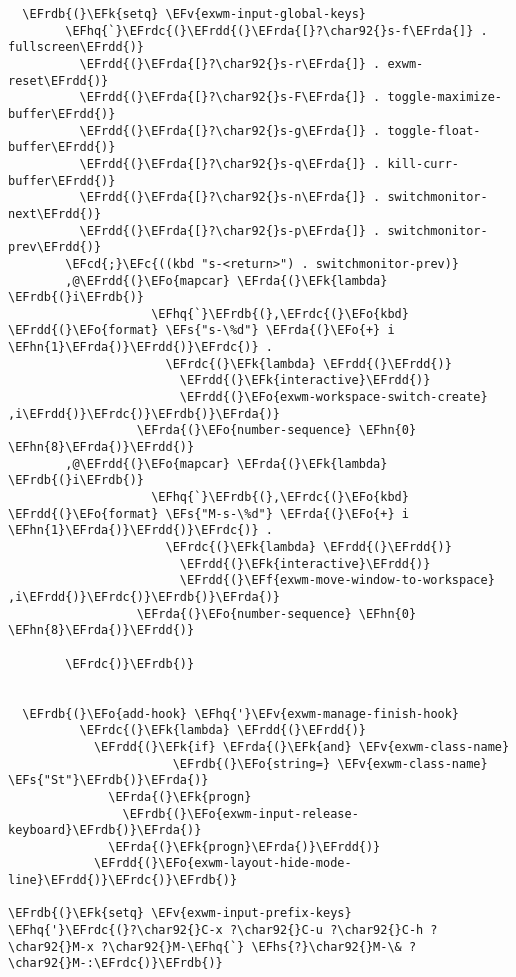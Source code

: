 \documentclass[a4wide,10pt]{article}
\newcommand{\EFc}[1]{\textcolor{EFc}{#1}} %
\newcommand{\EFcd}[1]{\textcolor{EFcd}{#1}} %
\newcommand{\EFs}[1]{\textcolor{EFs}{#1}} %
\newcommand{\EFk}[1]{\textcolor{EFk}{#1}} %
\newcommand{\EFf}[1]{\textcolor{EFf}{#1}} %
\newcommand{\EFv}[1]{\textcolor{EFv}{#1}} %
\newcommand{\EFo}[1]{\textcolor{EFo}{#1}} %
\newcommand{\EFhn}[1]{\textcolor{EFhn}{\textbf{#1}}} %
\newcommand{\EFhq}[1]{\textcolor{EFhq}{#1}} %
\newcommand{\EFhs}[1]{\textcolor{EFhs}{#1}} %
\newcommand{\EFrda}[1]{\textcolor{EFrda}{#1}} %
\newcommand{\EFrdb}[1]{\textcolor{EFrdb}{#1}} %
\newcommand{\EFrdc}[1]{\textcolor{EFrdc}{#1}} %
\newcommand{\EFrdd}[1]{\textcolor{EFrdd}{#1}} %
\begin{document}
\begin{Code}
\begin{Verbatim}
  \EFrdb{(}\EFk{setq} \EFv{exwm-input-global-keys}
        \EFhq{`}\EFrdc{(}\EFrdd{(}\EFrda{[}?\char92{}s-f\EFrda{]} . fullscreen\EFrdd{)}
          \EFrdd{(}\EFrda{[}?\char92{}s-r\EFrda{]} . exwm-reset\EFrdd{)}
          \EFrdd{(}\EFrda{[}?\char92{}s-F\EFrda{]} . toggle-maximize-buffer\EFrdd{)}
          \EFrdd{(}\EFrda{[}?\char92{}s-g\EFrda{]} . toggle-float-buffer\EFrdd{)}
          \EFrdd{(}\EFrda{[}?\char92{}s-q\EFrda{]} . kill-curr-buffer\EFrdd{)}
          \EFrdd{(}\EFrda{[}?\char92{}s-n\EFrda{]} . switchmonitor-next\EFrdd{)}
          \EFrdd{(}\EFrda{[}?\char92{}s-p\EFrda{]} . switchmonitor-prev\EFrdd{)}
        \EFcd{;}\EFc{((kbd "s-<return>") . switchmonitor-prev)}
        ,@\EFrdd{(}\EFo{mapcar} \EFrda{(}\EFk{lambda} \EFrdb{(}i\EFrdb{)}
                    \EFhq{`}\EFrdb{(},\EFrdc{(}\EFo{kbd} \EFrdd{(}\EFo{format} \EFs{"s-\%d"} \EFrda{(}\EFo{+} i \EFhn{1}\EFrda{)}\EFrdd{)}\EFrdc{)} .
                      \EFrdc{(}\EFk{lambda} \EFrdd{(}\EFrdd{)}
                        \EFrdd{(}\EFk{interactive}\EFrdd{)}
                        \EFrdd{(}\EFo{exwm-workspace-switch-create} ,i\EFrdd{)}\EFrdc{)}\EFrdb{)}\EFrda{)}
                  \EFrda{(}\EFo{number-sequence} \EFhn{0} \EFhn{8}\EFrda{)}\EFrdd{)}
        ,@\EFrdd{(}\EFo{mapcar} \EFrda{(}\EFk{lambda} \EFrdb{(}i\EFrdb{)}
                    \EFhq{`}\EFrdb{(},\EFrdc{(}\EFo{kbd} \EFrdd{(}\EFo{format} \EFs{"M-s-\%d"} \EFrda{(}\EFo{+} i \EFhn{1}\EFrda{)}\EFrdd{)}\EFrdc{)} .
                      \EFrdc{(}\EFk{lambda} \EFrdd{(}\EFrdd{)}
                        \EFrdd{(}\EFk{interactive}\EFrdd{)}
                        \EFrdd{(}\EFf{exwm-move-window-to-workspace} ,i\EFrdd{)}\EFrdc{)}\EFrdb{)}\EFrda{)}
                  \EFrda{(}\EFo{number-sequence} \EFhn{0} \EFhn{8}\EFrda{)}\EFrdd{)}

        \EFrdc{)}\EFrdb{)}


  \EFrdb{(}\EFo{add-hook} \EFhq{'}\EFv{exwm-manage-finish-hook}
          \EFrdc{(}\EFk{lambda} \EFrdd{(}\EFrdd{)}
            \EFrdd{(}\EFk{if} \EFrda{(}\EFk{and} \EFv{exwm-class-name}
                       \EFrdb{(}\EFo{string=} \EFv{exwm-class-name} \EFs{"St"}\EFrdb{)}\EFrda{)}
              \EFrda{(}\EFk{progn}
                \EFrdb{(}\EFo{exwm-input-release-keyboard}\EFrdb{)}\EFrda{)}
              \EFrda{(}\EFk{progn}\EFrda{)}\EFrdd{)}
            \EFrdd{(}\EFo{exwm-layout-hide-mode-line}\EFrdd{)}\EFrdc{)}\EFrdb{)}

\EFrdb{(}\EFk{setq} \EFv{exwm-input-prefix-keys}
\EFhq{'}\EFrdc{(}?\char92{}C-x ?\char92{}C-u ?\char92{}C-h ?\char92{}M-x ?\char92{}M-\EFhq{`} \EFhs{?}\char92{}M-\& ?\char92{}M-:\EFrdc{)}\EFrdb{)}



\end{Verbatim}
\end{Code}
\end{document}
